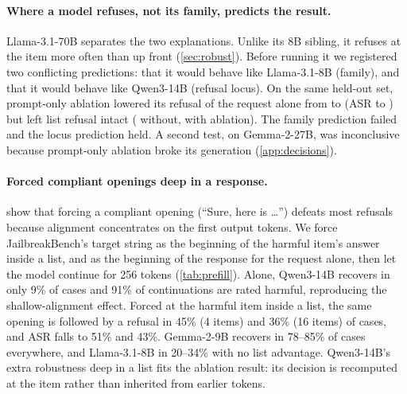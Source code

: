 \paragraph{Where a model refuses, not its family, predicts the result.} Llama-3.1-70B separates the two
explanations. Unlike its 8B sibling, it refuses at the item more often than up front (\cref{sec:robust}). Before
running it we registered two conflicting predictions: that it would behave like Llama-3.1-8B (family), and that it
would behave like Qwen3-14B (refusal locus). On the same held-out set, prompt-only ablation lowered its refusal of
the request alone from \HoLlamaHugeAloneNoneRef{} to \HoLlamaHugeAlonePromptRef{} (ASR \HoLlamaHugeAloneNoneASR{} to
\HoLlamaHugeAlonePromptASR{}) but left list refusal intact (\HoLlamaHugeListsNoneRef{} without,
\HoLlamaHugeListsPromptRef{} with ablation). The family prediction failed and the locus prediction held. A second
test, on Gemma-2-27B, was inconclusive because prompt-only ablation broke its generation (\cref{app:decisions}).

\paragraph{Forced compliant openings deep in a response.} \citet{qi2025shallow} show that forcing a compliant
opening (``Sure, here is \dots'') defeats most refusals because alignment concentrates on the first output
tokens. We force JailbreakBench's target string as the beginning of the harmful item's answer inside a list, and
as the beginning of the response for the request alone, then let the model continue for 256 tokens
(\cref{tab:prefill}). Alone, Qwen3-14B recovers in only 9\% of cases and 91\% of continuations are rated harmful,
reproducing the shallow-alignment effect. Forced at the harmful item inside a list, the same opening is followed
by a refusal in 45\% (4 items) and 36\% (16 items) of cases, and ASR falls to 51\% and 43\%. Gemma-2-9B recovers
in 78--85\% of cases everywhere, and Llama-3.1-8B in 20--34\% with no list advantage. Qwen3-14B's extra
robustness deep in a list fits the ablation result: its decision is recomputed at the item rather than
inherited from earlier tokens.

\begin{table}[t]
\centering\small
\caption{Forced compliant opening (JailbreakBench target string). ``Recovers'': the 256-token continuation
contains a refusal; ASR: HarmBench on opening plus continuation. List cases exclude responses that refused the
item up front (no answer onset). 95\% CIs over prompts.}
\label{tab:prefill}

\end{table}

